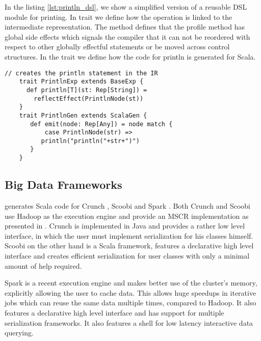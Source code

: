 In the listing \ref{lst:println_dsl}, we show a simplified version of a reusable DSL module for printing. In trait  we define how the  operation is linked to the intermediate representation. The  method defines that the profile method has global side effects which signals the compiler that it can not be reordered with respect to other globally effectful statements or be moved across control structures. In the  trait we define how the code for println is generated for Scala. 

\begin{lstlisting}[name=code, caption=Example of how the DSL module is specified. The module is used for profiling a block of code and can be reused in any other Scala backed DSL. \scode{Rep} types., captionpos=b, label=lst:println_dsl, float=t]
    // creates the println statement in the IR
    trait PrintlnExp extends BaseExp {
      def println[T](st: Rep[String]) =
        reflectEffect(PrintlnNode(st)) 
    }
    trait PrintlnGen extends ScalaGen {
       def emit(node: Rep[Any]) = node match {
           case PrintlnNode(str) =>
	      println("println("+str+")")
       }
    }
\end{lstlisting}

\subsection{Big Data Frameworks}
\label{subsed:big-data-frameworks}
\tool generates Scala code for Crunch \cite{_crunch_2012}, Scoobi \cite{nicta_scoobi_2012} and Spark \cite{matei_spark_????}. Both Crunch and Scoobi use Hadoop as the execution engine and provide an MSCR implementation as presented in \cite{chambers_flumejava:_2010}. Crunch is implemented in Java and provides a rather low level interface, in which the user must implement serialization for his classes himself. Scoobi on the other hand is a Scala framework, features a declarative high level interface and creates efficient serialization for user classes with only a minimal amount of help required. 

Spark is a recent execution engine and makes better use of the cluster's memory, explicitly allowing the user to cache data. This allows huge speedups in iterative jobs which can reuse the same data multiple times, compared to Hadoop. It also features a declarative high level interface and has support for multiple serialization frameworks. It also features a shell for low latency interactive data querying.

